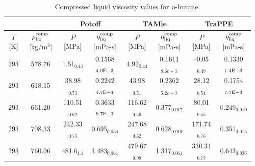 \documentclass[preprint,review,11pt]{elsarticle}
\begin{document}
\begin{landscape}
	\begin{table}[H]
		\caption{Compressed liquid viscosity values for \textit{n}-butane.}
		\begin{center}
			\begin{tabular}{|c|c|c|c|c|c|c|c|}
				\hline
				&                  & \multicolumn{2}{c|}{Potoff}     & \multicolumn{2}{c|}{TAMie}      & \multicolumn{2}{c|}{TraPPE}    \\ \hline
				$T$ {[}K{]} & $\rho^{\rm comp}_{\rm liq}$ {[}kg/m$^3${]} & $P$ {[}MPa{]}    & $\eta^{\rm comp}_{\rm liq}$ {[}mPa-s{]} & $P$ {[}MPa{]}    & $\eta^{\rm comp}_{\rm liq}$ {[}mPa-s{]} & $P$ {[}MPa{]}   & $\eta^{\rm comp}_{\rm liq}$ {[}mPa-s{]} \\ \hline
				293         & 578.76                                     & 1.51$_{0.43}$    & 0.1568$_{4.0 \rm E-3}$                      & 4.92$_{0.44}$    &	0.1611$_{8.6e-3}$                       & -0.05$_{0.49}$  & 0.1339$_{7.4 \rm E-3}$                      \\ \hline
				293         & 618.15                                     & 38.98$_{0.53}$   & 0.2242$_{4.7 \rm E-3}$                      & 43.98$_{0.51}$	 &  0.2362$_{5.2e-3}$                      & 28.12$_{0.54}$  & 0.1754$_{7.7 \rm E-3}$                      \\ \hline
				293         & 661.20                                     & 110.51$_{0.62}$  & 0.3633$_{9.7 \rm E-3}$                      & 116.62$_{0.46}$	 &  0.377$_{0.017}$                        & 80.01$_{0.55}$  & 0.249$_{0.010}$                        \\ \hline
				293         & 708.33                                     & 242.33$_{0.73}$  & 0.695$_{0.034}$                        & 247.68$_{0.62}$	     &  0.628$_{0.019}$                        & 171.74$_{0.76}$ & 0.351$_{0.015}$                        \\ \hline
				293         & 760.06                                     & 481.6$_{1.1}$    & 1.483$_{0.061}$                        & 479.67$_{0.98}$	     &  1.317$_{0.061}$                        & 330.31$_{0.79}$ & 0.643$_{0.036}$                        \\ \hline
			\end{tabular}
		\end{center}
	\end{table}


\end{landscape}
\end{document}
